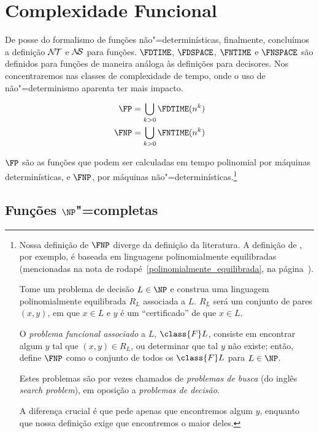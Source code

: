 \section{Complexidade Funcional}

De posse do formalismo de funções não"=determinísticas,
finalmente,
concluímos a definição ${\mathcal{N\!T}}$ e ${\mathcal{N\!\!S}}$ para funções.
$\FDTIME$, $\FDSPACE$, $\FNTIME$ e $\FNSPACE$
são definidos para funções de maneira análoga às definições para decisores.
Nos concentraremos nas classes de complexidade de tempo,
onde o uso de não"=determinismo aparenta ter mais impacto.

\begin{definition}
    \begin{align*}
        \FP &= \bigcup_{k > 0} \FDTIME(n^k) \\
        \FNP &= \bigcup_{k > 0} \FNTIME(n^k)
    \end{align*}
\end{definition}

$\FP$ são as funções que podem ser calculadas
em tempo polinomial por máquinas determinísticas,
e $\FNP$, por máquinas não"=determinísticas.\footnote{
    Nossa definição de $\FNP$ diverge da definição da literatura.
    A definição de ,
    por exemplo,
    é baseada em linguagens polinomialmente equilibradas
    (mencionadas na nota de rodapé~\ref{polinomialmente_equilibrada},
    na página~\pageref{polinomialmente_equilibrada}).

    Tome um problema de decisão $L \in \NP$
    e construa uma linguagem polinomialmente equilibrada $R_L$ associada a $L$.
    $R_L$ será um conjunto de pares $(x, y)$,
    em que $x \in L$ e $y$ é um ``certificado'' de que $x \in L$.

    O \emph{problema funcional associado} a $L$, $\class{F}L$,
    consiste em encontrar algum $y$ tal que $(x, y) \in R_L$,
    ou determinar que tal $y$ não existe;
    então,
     define $\FNP$
    como o conjunto de todos os $\class{F}L$
    para $L \in \NP$.

    Estes problemas são por vezes chamados de \emph{problemas de busca}
    (do inglês \emph{search problem}),
    em oposição a \emph{problemas de decisão}.

    A diferença crucial é que 
    pede apenas que encontremos algum $y$,
    enquanto que nossa definição exige que encontremos o maior deles.
}

\subsection{Funções $\NP$"=completas}
